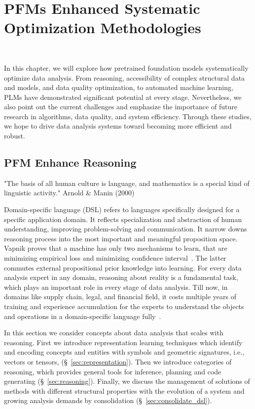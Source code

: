 \section{PFMs Enhanced Systematic Optimization Methodologies}~\label{sec:methods}
    
In this chapter, we will explore how pretrained foundation models systematically optimize data analysis. From reasoning, accessibility of complex structural data and models, and data quality optimization, to automated machine learning, PLMs have demonstrated significant potential at every stage. Nevertheless, we also point out the current challenges and emphasize the importance of future research in algorithms, data quality, and system efficiency. Through these studies, we hope to drive data analysis systems toward becoming more efficient and robust.

\subsection{PFM Enhance Reasoning}\label{sec:dsl}

"The basis of all human culture is language, and mathematics is a special kind of linguistic activity." Arnold \& Manin (2000)

Domain-specific language (DSL) refers to languages specifically designed for a specific application domain. It reflects specialization and abstraction of human understanding, improving problem-solving and communication. It narrow downs reasoning process into the most important and meaningful proposition space. Vapnik proves that a machine has only two mechanisms to learn, that are minimizing empirical loss and minimizing confidence interval~\cite{vapnik2019rethinking}. The latter commutes external propositional prior knowledge into learning. For every data analysis expert in any domain, reasoning about reality is a fundamental task, which plays an important role in every stage of data analysis. Till now, in domains like supply chain, legal, and financial field, it costs multiple years of training and experience accumulation for the experts to understand the objects and operations in a domain-specific language fully~\cite{garcia2010using}. 

In this section we consider concepts about data analysis that scales with reasoning. First we introduce representation learning techniques which identify and encoding concepts and entities with symbols and geometric signatures, i.e., vectors or tensors, (\S~\ref{sec:representation}). Then we introduce categories of reasoning, which provides general tools for inference, planning and code generating (\S~\ref{sec:reasoning}). Finally, we discuss the management of solutions of methods with different structural properties with the evolution of a system and growing analysis demands by consolidation (\S~\ref{sec:consolidate_dsl}).


